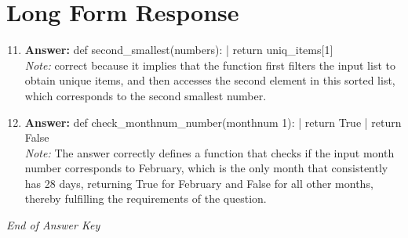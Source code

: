 \documentclass[12pt]{article}
\begin{document}
\section*{Long Form Response}
\begin{enumerate}[label=\arabic*.]
\setcounter{enumi}{10}
\item \textbf{Answer:} def second\_smallest(numbers): | return uniq\_items[1]
\\ \textit{Note:} correct because it implies that the function first filters the input list to obtain unique items, and then accesses the second element in this sorted list, which corresponds to the second smallest number.
\item \textbf{Answer:} def check\_monthnum\_number(monthnum 1): | return True | return False
\\ \textit{Note:} The answer correctly defines a function that checks if the input month number corresponds to February, which is the only month that consistently has 28 days, returning True for February and False for all other months, thereby fulfilling the requirements of the question.
\end{enumerate}

\vfill
\noindent\textit{End of Answer Key}
\end{document}
